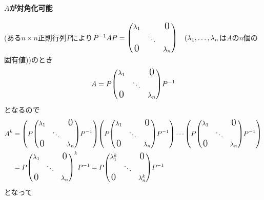 \documentclass[autodetect-engine,dvipdfmx-if-dvi,ja=standard]{bxjsarticle}
\theoremstyle{mystyle1}
\theoremstyle{mystyle2}
\newcommand{\Largezero}{\ensuremath{\text{\Large{0}}}}
\begin{document}
\paragraph{$A$が対角化可能}(ある$n\times n$正則行列$P$により$P^{-1}AP=\mqty(
\lambda_1&&\Largezero\\
&\ddots&\\
\Largezero&&\lambda_n
)\quad(\lambda_1,\ldots,\lambda_n$は$A$の$n$個の固有値))のとき
\[A=P\mqty(
  \lambda_1&&\Largezero\\
  &\ddots&\\
  \Largezero&&\lambda_n
  )P^{-1}\]
となるので
\begin{align*}
  A^k
              & =\qty(P\mqty(
  \lambda_1   &               & \Largezero  \\
              & \ddots        &             \\
  \Largezero  &               & \lambda_n
  )P^{-1})\qty(P\mqty(
  \lambda_1   &               & \Largezero  \\
              & \ddots        &             \\
  \Largezero  &               & \lambda_n
  )P^{-1})\cdots\qty(P\mqty(
  \lambda_1   &               & \Largezero  \\
              & \ddots        &             \\
  \Largezero  &               & \lambda_n
  )P^{-1})                                  \\
              & =P\mqty(
  \lambda_1   &               & \Largezero  \\
              & \ddots        &             \\
  \Largezero  &               & \lambda_n
  )^kP^{-1}=P\mqty(
  \lambda_1^k &               & \Largezero  \\
              & \ddots        &             \\
  \Largezero  &               & \lambda_n^k
  )P^{-1}
\end{align*}
となって
\end{document}
